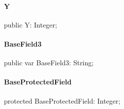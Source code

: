 \documentclass{report}
\begin{document}
\paragraph*{Y}\hspace*{\fill}

\begin{list}{}{
\setlength{\itemindent}{0cm}
\setlength{\listparindent}{0cm}
\setlength{\leftmargin}{\evensidemargin}
\addtolength{\leftmargin}{\tmplength}
\settowidth{\labelsep}{X}
\addtolength{\leftmargin}{\labelsep}
\setlength{\labelwidth}{\tmplength}
}
\begin{flushleft}
\item[\textbf{Declaration}\hfill]
\begin{ttfamily}
public Y: Integer;\end{ttfamily}


\end{flushleft}
\end{list}
\paragraph*{BaseField3}\hspace*{\fill}

\begin{list}{}{
\setlength{\itemindent}{0cm}
\setlength{\listparindent}{0cm}
\setlength{\leftmargin}{\evensidemargin}
\addtolength{\leftmargin}{\tmplength}
\settowidth{\labelsep}{X}
\addtolength{\leftmargin}{\labelsep}
\setlength{\labelwidth}{\tmplength}
}
\begin{flushleft}
\item[\textbf{Declaration}\hfill]
\begin{ttfamily}
public var BaseField3: String;\end{ttfamily}


\end{flushleft}
\end{list}
\paragraph*{BaseProtectedField}\hspace*{\fill}

\begin{list}{}{
\setlength{\itemindent}{0cm}
\setlength{\listparindent}{0cm}
\setlength{\leftmargin}{\evensidemargin}
\addtolength{\leftmargin}{\tmplength}
\settowidth{\labelsep}{X}
\addtolength{\leftmargin}{\labelsep}
\setlength{\labelwidth}{\tmplength}
}
\begin{flushleft}
\item[\textbf{Declaration}\hfill]
\begin{ttfamily}
protected BaseProtectedField: Integer;\end{ttfamily}


\end{flushleft}
\end{list}
\end{document}
